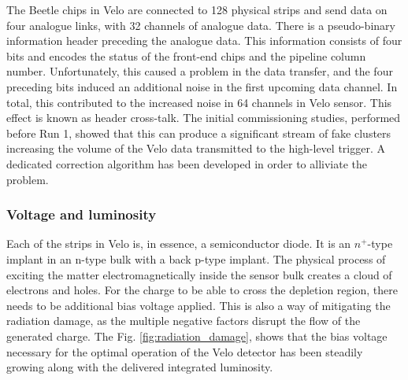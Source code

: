 The Beetle chips in Velo are connected to 128 physical strips and send data on four analogue links, with 32 channels of analogue data.
There is a pseudo-binary information header preceding the analogue data.
This information consists of four bits and encodes the status of the front-end chips and the pipeline column number.
Unfortunately, this caused a problem in the data transfer, and the four preceding bits induced an additional noise in the first upcoming data channel.
In total, this contributed to the increased noise in 64 channels in Velo sensor.
This effect is known as header cross-talk\cite{Szumlak:1177860}. The initial commissioning studies, performed before Run 1, showed that this can produce a significant stream of fake clusters increasing the volume of the Velo data transmitted to the high-level trigger. A dedicated correction algorithm has been developed in order to alliviate the problem.

\subsubsection{Voltage and luminosity}
\label{chap2:lumivolt}

Each of the strips in Velo is, in essence, a semiconductor diode. It is an $n^{+}$-type implant in an n-type bulk with a back p-type implant\cite{Akiba:2633496}.
The physical process of exciting the matter electromagnetically inside the sensor bulk creates a cloud of electrons and holes.
For the charge to be able to cross the depletion region, there needs to be additional bias voltage applied.
This is also a way of mitigating the radiation damage, as the multiple negative factors disrupt the flow of the generated charge.
The Fig. \ref{fig:radiation_damage}, shows that the bias voltage necessary for the optimal operation of the Velo detector has been steadily growing along with the delivered integrated luminosity.

